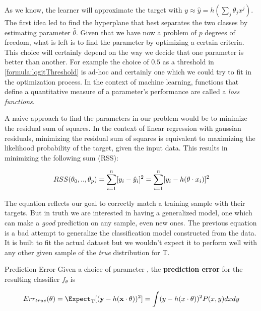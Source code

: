 
As we know, the learner will approximate the target with $y \approx \hat{y} = h\left(\sum_{j}\theta_j x^j\right)$. The first idea led to find the hyperplane that best separates the two classes by estimating parameter $\hat{\theta}$. Given that we have now a problem of $p$ degrees of freedom, what is left is to find the parameter by optimizing a certain criteria. This choice will certainly depend on the way we decide that one parameter is better than another. For example the choice of $0.5$ as a threshold in \ref{formula:logitThreshold} is ad-hoc and certainly one which we could try to fit in the optimization process. In the context of machine learning, functions that define a quantitative measure of a parameter's performance  are called a \textit{loss functions}.

A naive approach to find the parameters in our problem would be to minimize the residual sum of squares. In the context of linear regression with gaussian residuals, minimizing the residual sum of squares is equivalent to maximizing the likelihood probability of the target, given the input data. This results in minimizing the following sum (RSS):   

\begin{equation} \label{eq:rss}
RSS(\theta_0,..,\theta_p)  = \sum_{i=1}^n [y_i - \hat{y}_i]^2  \\
=  \sum_{i=1}^n [y_i - h( \theta \cdot x_i)]^2
\end{equation}

The equation reflects our goal to correctly match a training sample with their targets. But in truth we are interested in having a generalized model, one which can make a \textit{good} prediction on any sample, even new ones. The previous equation is a bad attempt to generalize the classification model constructed from the data. It is built to fit the actual dataset but we wouldn't expect it to perform well with any other given sample of the \textit{true} distribution for $\mathrm{T}$. 

\begin{definition}{Prediction Error}
Given a choice of parameter \theta, the \textbf{prediction error} for the resulting classifier $f_\theta$ is

\[
    Err_{true}(\theta)  = \Expect_{ \mathrm{T}}[(\textbf{y} - h(\textbf{x} \cdot \theta) )^2] \\
    = \int (y - h(x \cdot \theta) )^2 P(x,y)dxdy
\]
\end{definition}


